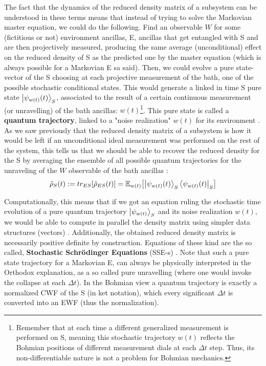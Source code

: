 \documentclass[11pt, a4paper]{article} %
\begin{document}
The fact that the dynamics of the reduced density matrix of a subsystem can be understood in these terms means that instead of trying to solve the Markovian master equation, we could do the following. Find an observable $W$ for some (fictitious or not) environment ancillas, E, ancillas that get entangled with S and are then projectively measured, producing the same average (unconditional) effect on the reduced density of S as the predicted one by the master equation (which is always possible for a Markovian E sa said). Then, we could evolve a pure state-vector of the S choosing at each projective measurement of the bath, one of the possible stochastic conditional states. This would generate a linked in time S pure state $\ket{\psi_{w(t)}(t)}_S$, associated to the result of a certain continuous measurement (or unravelling) of the bath ancillas: $w(t)$\footnote{Remember that at each time a different generalized measurement is performed on S, meaning this stochastic trajectory $w(t)$ reflects the Bohmian positions of different measurement dials at each $\Delta t$ step. Thus, its non-differentiable nature is not a problem for Bohmian mechanics.}. This pure state is called a {\bf quantum trajectory}, linked to a "noise realization" $w(t)$ for its environment \cite{Generalized, MarkovianityDefs, QuantumTrajs}. As we saw previously that the reduced density matrix of a subsystem is how it would be left if an unconditional ideal measurement was performed on the rest of the system, this tells us that we should be able to recover the reduced density for the S by averaging the ensemble of all possible quantum trajectories for the unraveling of the $W$ observable of the bath ancillas \cite{MarkovianityDefs,QuantumTrajs}:
\begin{equation}
\hat{\rho}_S(t):=tr_{ES}[\hat{\rho}_{ES}(t)]=\mathbb{E}_{w(t)}\qty[\ket{\psi_{w(t)}(t)}_S\bra{\psi_{w(t)}(t)}_S]
\end{equation}

Computationally, this means that if we got an equation ruling the stochastic time evolution of a pure quantum trajectory $\ket{\psi_{w(t)}}_S$ and its noise realization $w(t)$, we would be able to compute in parallel the density matrix using simpler data structures (vectors) \cite{MarkovianityDefs, QuantumTrajs}. Additionally, the obtained reduced density matrix is necessarily positive definite by construction. Equations of these kind are the so called, {\bf Stochastic Schrödinger Equations} (SSE-s) \cite{Generalized, continousMeas}. Note that such a pure state trajectory for a Markovian E, can always be physically interpreted in the Orthodox explanation, as a so called pure unravelling \cite{MarkovianityDefs} (where one would invoke the collapse at each $\Delta t$). In the Bohmian view a quantum trajectory is exactly a normalized CWF of the S (in ket notation), which every significant $\Delta t$ is converted into an EWF (thus the normalization).
\end{document}
